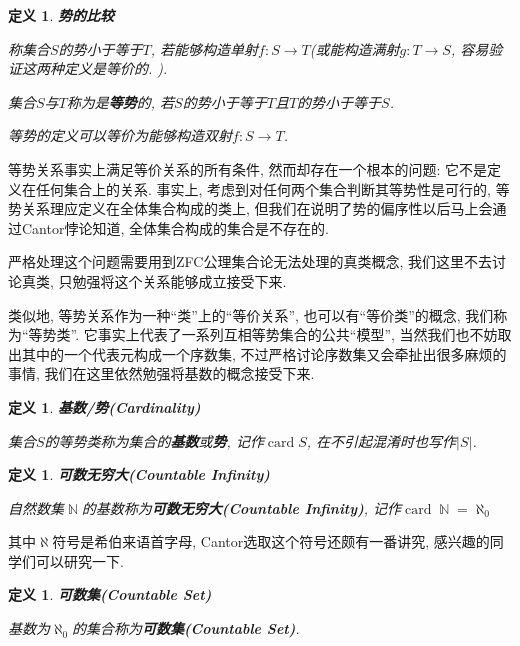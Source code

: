 \documentclass[UTF8]{ctexart}
\newcommand{\<}{\langle}
\renewcommand{\>}{\rangle}
\DeclareMathOperator{\N}{\mathbb{N}}
\DeclareMathOperator{\card}{card}
\newtheorem{dfn}[thm]{定义}
\begin{document}
            \begin{dfn}
                \textbf{势的比较}

                称集合$S$的势小于等于$T$, 若能够构造单射$f:S\to T$(或能构造满射$g:T\to S$, 容易验证这两种定义是等价的. ). 

                集合$S$与$T$称为是\textbf{等势}的, 若$S$的势小于等于$T$且$T$的势小于等于$S$. 
                
                等势的定义可以等价为能够构造双射$f:S\to T$. 
            \end{dfn}

            等势关系事实上满足等价关系的所有条件, 然而却存在一个根本的问题: 它不是定义在任何集合上的关系. 事实上, 考虑到对任何两个集合判断其等势性是可行的, 等势关系理应定义在全体集合构成的类上, 但我们在说明了势的偏序性以后马上会通过Cantor悖论知道, 全体集合构成的集合是不存在的. 

            严格处理这个问题需要用到ZFC公理集合论无法处理的真类概念, 我们这里不去讨论真类, 只勉强将这个关系能够成立接受下来. 

            类似地, 等势关系作为一种``类''上的``等价关系'', 也可以有``等价类''的概念, 我们称为``等势类''. 它事实上代表了一系列互相等势集合的公共``模型'', 当然我们也不妨取出其中的一个代表元构成一个序数集, 不过严格讨论序数集又会牵扯出很多麻烦的事情, 我们在这里依然勉强将基数的概念接受下来. 

            \begin{dfn}
                \textbf{基数/势(Cardinality)}

                集合$S$的等势类称为集合的\textbf{基数}或\textbf{势}, 记作$\card S$, 在不引起混淆时也写作$|S|$. 
            \end{dfn}

            \begin{dfn}
                \textbf{可数无穷大(Countable Infinity)}

                自然数集$\N$的基数称为\textbf{可数无穷大(Countable Infinity)}, 记作$\card\N=\aleph_0$
            \end{dfn}

            其中$\aleph$符号是希伯来语首字母, Cantor选取这个符号还颇有一番讲究, 感兴趣的同学们可以研究一下. 
            
            \begin{dfn}
                \textbf{可数集(Countable Set)}

                基数为$\aleph_0$的集合称为\textbf{可数集(Countable Set)}. 
            \end{dfn}
            
\end{document}
